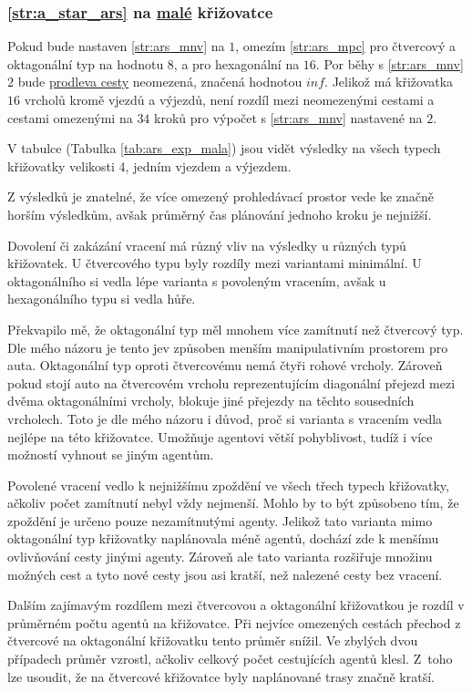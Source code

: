 \subsubsection{\ref{str:a_star_ars} na \hyperref[par:data_mala]{malé} křižovatce}
\label{subsubsec:exp_ars_mala_krizovatka}

Pokud bude nastaven \ref{str:ars_mnv} na $1$, omezím \ref{str:ars_mpc}
pro čtvercový a oktagonální typ na hodnotu $8$, a pro hexagonální na $16$.
Por běhy s \ref{str:ars_mnv} $2$ bude \hyperref[par:ars_mpc]{prodleva cesty} neomezená, značená hodnotou $inf$.
Jelikož má křižovatka $16$ vrcholů kromě vjezdů a výjezdů, není rozdíl mezi neomezenými cestami a
cestami omezenými na $34$ kroků pro výpočet s \ref{str:ars_mnv} nastavené na $2$.

V tabulce (Tabulka \ref{tab:ars_exp_mala}) jsou vidět výsledky na všech typech křižovatky
velikosti 4, jedním vjezdem a výjezdem.


Z výsledků je znatelné, že více omezený prohledávací prostor vede ke značně horším výsledkům,
avšak průměrný čas plánování jednoho kroku je nejnižší.

Dovolení či zakázání vracení má různý vliv na výsledky u různých typů křižovatek.
U čtvercového typu byly rozdíly mezi variantami minimální.
U oktagonálního si vedla lépe varianta s povoleným vracením, avšak u hexagonálního typu si vedla hůře.

Překvapilo mě, že oktagonální typ měl mnohem více zamítnutí než čtvercový typ.
Dle mého názoru je tento jev způsoben menším manipulativním prostorem pro auta.
Oktagonální typ oproti čtvercovému nemá čtyři rohové vrcholy.
Zároveň pokud stojí auto na čtvercovém vrcholu reprezentujícím diagonální přejezd mezi dvěma oktagonálními vrcholy,
blokuje jiné přejezdy na těchto sousedních vrcholech. %
Toto je dle mého názoru i důvod, proč si varianta s vracením vedla nejlépe na této křižovatce.
Umožňuje agentovi větší pohyblivost, tudíž i více možností vyhnout se jiným agentům.

Povolené vracení vedlo k nejnižšímu zpoždění ve všech třech typech křižovatky,
ačkoliv počet zamítnutí nebyl vždy nejmenší.
Mohlo by to být způsobeno tím, že zpoždění je určeno pouze nezamítnutými agenty.
Jelikož tato varianta mimo oktagonální typ křižovatky naplánovala méně agentů,
dochází zde k menšímu ovlivňování cesty jinými agenty.
Zároveň ale tato varianta rozšiřuje množinu možných cest a tyto nové cesty jsou asi kratší,
než nalezené cesty bez vracení.

Dalším zajímavým rozdílem mezi čtvercovou a oktagonální křižovatkou je rozdíl v průměrném počtu agentů na křižovatce.
Při nejvíce omezených cestách přechod z čtvercové na oktagonální křižovatku tento průměr snížil.
Ve zbylých dvou případech průměr vzrostl, ačkoliv celkový počet cestujících agentů klesl.
Z~toho lze usoudit, že na čtvercové křižovatce byly naplánované trasy značně kratší.

